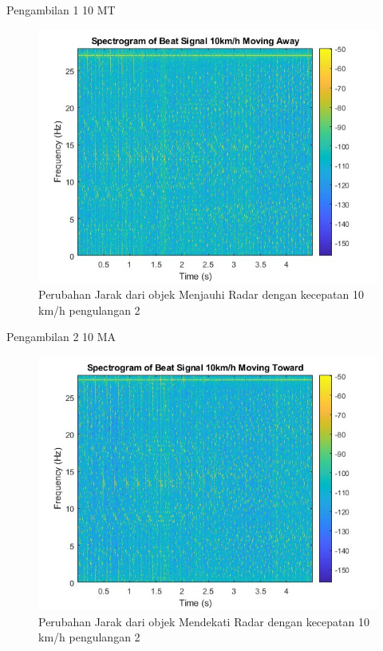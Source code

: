 Pengambilan 1 10 MT

\begin{figure}
	\centering
	\includegraphics[scale=0.6]{pics/bab5/Velocity/2_10MA.jpg}
	\caption{Perubahan Jarak dari objek Menjauhi Radar dengan kecepatan 10 km/h pengulangan 2}
	\label{fig:pengambilan2_10MA}
\end{figure}

Pengambilan 2 10 MA

\begin{figure}
	\centering
	\includegraphics[scale=0.6]{pics/bab5/Velocity/2_10MT.jpg}
	\caption{Perubahan Jarak dari objek Mendekati Radar dengan kecepatan 10 km/h pengulangan 2}
	\label{fig:pengambilan2_10MT}
\end{figure}

